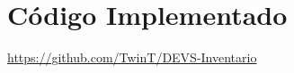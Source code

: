 \documentclass[10pt]{article}
\begin{document}
\appendix
\section{Código Implementado}

\url{https://github.com/TwinT/DEVS-Inventario}



\end{document}
